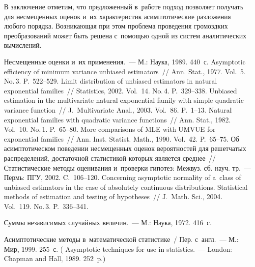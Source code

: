 \begin{multicols}{2}
 В заключение отметим, что предложенный в~работе подход
 позволяет получать для несмещенных оценок и~их характеристик
 асимптотические разложения любого порядка. Возникающая при этом проблема проведения громоздких преобразований может быть решена с~по\-мощью одной из систем аналитических вычислений.



{\small\frenchspacing
 {%
 \begin{thebibliography}{99}
 Несмещенные оценки и~их
  применения.~--- М.: Наука, 1989. 440~с.
 Asymptotic efficiency of minimum variance unbiased
 estimators~// Ann.  Stat., 1977. Vol.~5. No.\,3.  P.~522--529.
 Limit distribution of
 unbiased estimators in natural exponential families~// Statistics,
 2002. Vol.~14. No.\,4.  P.~329--338.
 Unbiased estimation in the
  multivariate natural exponential family with simple quadratic variance function~// 
  J.~Multivariate Anal., 2003. Vol.~86. P.~1--13.
 Natural exponential families with quadratic
 variance functions~// Ann. Stat., 1982. Vol.~10.
 No.\,1.  P.~65--80.
 More comparisons of MLE with UMVUE for
 exponential families~// Ann. Inst. Statist. Math., 1990. Vol.~42.
 P.~65--75.
 Об асимптотическом поведении несмещенных
  оценок вероятностей для решетчатых распределений, достаточной статистикой
  которых является среднее~// Статистические методы оценивания и~проверки гипотез: Межвуз. сб. науч. тр.~--- Пермь: ПГУ, 2002. C.~106--120.
 Concerning asymptotic normality
  of a~class of unbiased estimators in the case of absolutely continuous
  distributions. Statistical methods of estimation and testing of hypotheses~//
  J.~Math. Sci., 2004. Vol.~119. No.\,3. P.~336--341.



 Суммы независимых случайных величин.~--- М.: Наука, 1972.
416~с.

 Асимптотические методы в~математической статистике~/
Пер. с~англ.~--- М.: Мир, 1999. 255~с. ( Asymptotic techniques for use in statistics.~---
London: Chapman and Hall, 1989. 252~p.)


\end{thebibliography}}}
\end{multicols}
